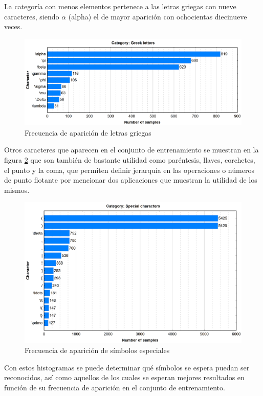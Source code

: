 \newpage
La categoría con menos elementos pertenece a las letras griegas con nueve caracteres, siendo $\alpha$ (alpha) el de mayor aparición con ochocientas diecinueve veces.
\begin{figure}[H]
	\centering
	\includegraphics[width=1\textwidth]{capitulo3/imgs/greek_letters_distribution.png}
	\caption{Frecuencia de aparición de letras griegas \cite{EXTRACTOR}}
	\label{fig:GreekLetters}
\end{figure}
\newpage
Otros caracteres que aparecen en el conjunto de entrenamiento se muestran en la figura \ref{fig:SpecialSymbols} que son también de bastante utilidad como paréntesis, llaves, corchetes, el punto y la coma, que permiten definir jerarquía en las operaciones o números de punto flotante por mencionar dos aplicaciones que muestran la utilidad de los mismos. 
\begin{figure}[H]
	\centering
	\includegraphics[width=1\textwidth]{capitulo3/imgs/special_characters_distribution.png}
	\caption{Frecuencia de aparición de símbolos especiales \cite{EXTRACTOR}}
	\label{fig:SpecialSymbols}
\end{figure}

Con estos histogramas se puede determinar qué símbolos se espera puedan ser reconocidos, así como aquellos de los cuales se esperan mejores resultados en función de su frecuencia de aparición en el conjunto de entrenamiento.

